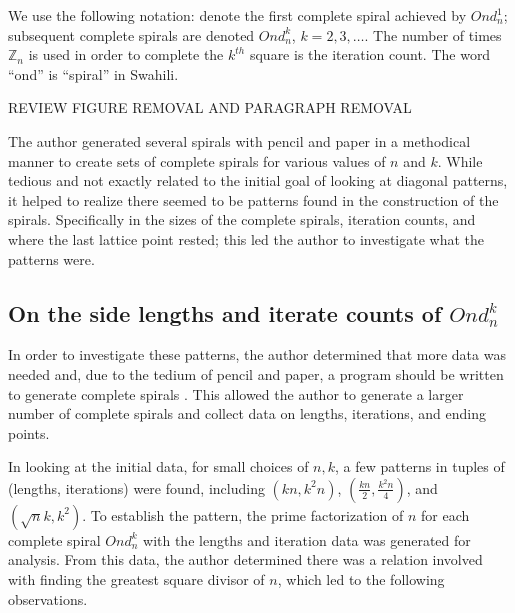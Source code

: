 \documentclass[11pt,reqno]{amsart}
\theoremstyle{mydef}
\def\ZZ{\mathbb{Z}}
\begin{document}
We use the following notation: denote the first complete spiral
achieved by $Ond^1_n$; subsequent complete spirals are denoted
$Ond^k_n$, $k = 2,3,\dots$.  The number of times $\ZZ_n$ is used in
order to complete the $k^{th}$ square is the iteration count.  The
word ``ond'' is ``spiral'' in Swahili.

REVIEW FIGURE REMOVAL AND PARAGRAPH REMOVAL

The author generated several spirals with pencil and paper in a
methodical manner to create sets of complete spirals for various
values of $n$ and $k$.  While tedious and not exactly related to the
initial goal of looking at diagonal patterns, it helped to realize
there seemed to be patterns found in the construction of the spirals.
Specifically in the sizes of the complete spirals, iteration counts,
and where the last lattice point rested; this led the author to
investigate what the patterns were.

\subsection{On the side lengths and iterate counts of $Ond^k_n$}

In order to investigate these patterns, the author determined that
more data was needed and, due to the tedium of pencil and paper, a
program should be written to generate complete spirals
\cite{PySquare}.  This allowed the author to generate a larger number
of complete spirals and collect data on lengths, iterations, and
ending points.

In looking at the initial data, for small choices of $n, k$, a few
patterns in tuples of (lengths, iterations) were found, including
$(kn, k^2 n)$, $(\frac{kn}{2}, \frac{k^2 n}{4})$, and $(\sqrt{n}k,
k^2)$.  To establish the pattern, the prime factorization of $n$ for
each complete spiral $Ond^k_n$ with the lengths and iteration data was
generated for analysis.  From this data, the author determined there
was a relation involved with finding the greatest square divisor of
$n$, which led to the following observations.
\end{document}

